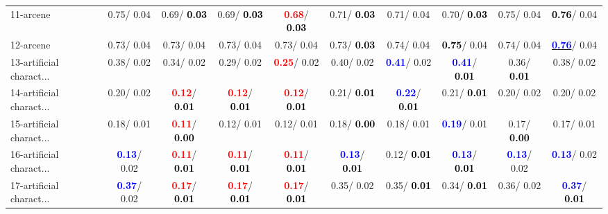 \begin{table}[h]
\begin{center}
{\begin{tabular}{lc|c|c|c|c|c|c|c|c}
11-arcene &   0.75/  0.04 &   0.69/\textcolor{black}{\textbf{  0.03}} &   0.69/\textcolor{black}{\textbf{  0.03}} & \textcolor{red}{\textbf{  0.68}}/\textcolor{black}{\textbf{  0.03}} &   0.71/\textcolor{black}{\textbf{  0.03}} &   0.71/  0.04 &   0.70/\textcolor{black}{\textbf{  0.03}} &   0.75/  0.04 & \textcolor{black}{\textbf{  0.76}}/  0.04 \\
12-arcene &   0.73/  0.04 &   0.73/  0.04 &   0.73/  0.04 &   0.73/  0.04 &   0.73/\textcolor{black}{\textbf{  0.03}} &   0.74/  0.04 & \textcolor{black}{\textbf{  0.75}}/  0.04 &   0.74/  0.04 & \underline{\textcolor{blue}{\textbf{  0.76}}}/  0.04 \\
13-artificial charact... &   0.38/  0.02 &   0.34/  0.02 &   0.29/  0.02 & \textcolor{red}{\textbf{  0.25}}/  0.02 &   0.40/  0.02 & \textcolor{blue}{\textbf{  0.41}}/  0.02 & \textcolor{blue}{\textbf{  0.41}}/\textcolor{black}{\textbf{  0.01}} &   0.36/\textcolor{black}{\textbf{  0.01}} &   0.38/  0.02 \\
14-artificial charact... &   0.20/  0.02 & \textcolor{red}{\textbf{  0.12}}/\textcolor{black}{\textbf{  0.01}} & \textcolor{red}{\textbf{  0.12}}/\textcolor{black}{\textbf{  0.01}} & \textcolor{red}{\textbf{  0.12}}/\textcolor{black}{\textbf{  0.01}} &   0.21/\textcolor{black}{\textbf{  0.01}} & \textcolor{blue}{\textbf{  0.22}}/\textcolor{black}{\textbf{  0.01}} &   0.21/\textcolor{black}{\textbf{  0.01}} &   0.20/  0.02 &   0.20/  0.02 \\ \hline
15-artificial charact... &   0.18/  0.01 & \textcolor{red}{\textbf{  0.11}}/\textcolor{black}{\textbf{  0.00}} &   0.12/  0.01 &   0.12/  0.01 &   0.18/\textcolor{black}{\textbf{  0.00}} &   0.18/  0.01 & \textcolor{blue}{\textbf{  0.19}}/  0.01 &   0.17/\textcolor{black}{\textbf{  0.00}} &   0.17/  0.01 \\
16-artificial charact... & \textcolor{blue}{\textbf{  0.13}}/  0.02 & \textcolor{red}{\textbf{  0.11}}/\textcolor{black}{\textbf{  0.01}} & \textcolor{red}{\textbf{  0.11}}/\textcolor{black}{\textbf{  0.01}} & \textcolor{red}{\textbf{  0.11}}/\textcolor{black}{\textbf{  0.01}} & \textcolor{blue}{\textbf{  0.13}}/\textcolor{black}{\textbf{  0.01}} &   0.12/\textcolor{black}{\textbf{  0.01}} & \textcolor{blue}{\textbf{  0.13}}/\textcolor{black}{\textbf{  0.01}} & \textcolor{blue}{\textbf{  0.13}}/  0.02 & \textcolor{blue}{\textbf{  0.13}}/  0.02 \\
17-artificial charact... & \textcolor{blue}{\textbf{  0.37}}/  0.02 & \textcolor{red}{\textbf{  0.17}}/\textcolor{black}{\textbf{  0.01}} & \textcolor{red}{\textbf{  0.17}}/\textcolor{black}{\textbf{  0.01}} & \textcolor{red}{\textbf{  0.17}}/\textcolor{black}{\textbf{  0.01}} &   0.35/  0.02 &   0.35/\textcolor{black}{\textbf{  0.01}} &   0.34/\textcolor{black}{\textbf{  0.01}} &   0.36/  0.02 & \textcolor{blue}{\textbf{  0.37}}/\textcolor{black}{\textbf{  0.01}} \\

\end{tabular}}
\end{center}
\end{table}
